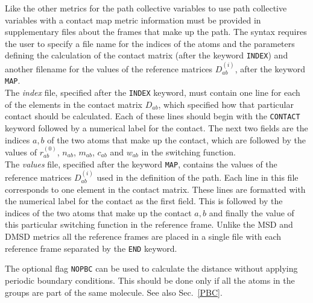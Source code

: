\documentclass[12pt,fleqn]{report}
\newcommand{\keyword}[1]{\index{Keywords!{\tt #1}} {\tt #1}}
\begin{document}
 Like the other metrics for the path collective variables to use path collective variables with a contact map metric
 information must be provided in supplementary files about the frames that make up the path.  
 The syntax requires the user to specify a file name for the indices of the atoms and the parameters defining 
 the calculation of the contact matrix (after the keyword  {\tt INDEX}) and another filename for the values of the 
 reference matrices $D_{ab}^{(i)}$, after the keyword {\tt MAP}.  
 \\
 The {\it index} file, specified after the  {\tt INDEX} keyword, must contain one line for each of the elements in the 
 contact matrix $D_{ab}$, which specified how that particular contact should be calculated.  
   Each of these lines should begin with the {\tt CONTACT} keyword
 followed by a numerical label for the contact.  The next two fields are the indices $a,b$  of
 the two atoms that make up the contact, which are followed by the values of 
 $r_{ab}^{(0)}$, $n_{ab}$, $m_{ab}$, $c_{ab}$ and $w_{ab}$ in the switching function.
\\
The {\it values} file, specified  after the keyword {\tt MAP},
contains the values of the reference matrices $D_{ab}^{(i)}$ used in the definition of the path. 
Each line in this file corresponds to one element in the contact matrix. These lines are formatted 
with the numerical label for the contact as the first field.  This is followed by the indices of the two atoms
that make up the contact $a,b$ and finally the value of this particular switching function in 
the reference frame.  Unlike the MSD and DMSD metrics all the reference frames are placed in a single file
with each reference frame separated by the {\tt END} keyword.

The optional flag \keyword{NOPBC} can be used to calculate the distance without applying periodic
boundary conditions. This should be done only if all the atoms in the groups are part of the same molecule. See also
Sec.~\ref{PBC}.

\end{document}

